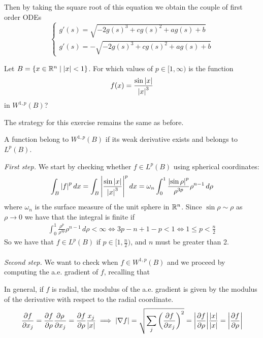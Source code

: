 Then by taking the square root of this equation we obtain the couple of first order ODEs
\[
    \begin{cases}
        g'(s) = \sqrt{-2 g(s)^3 + c g(s)^2 + a g(s) + b} \\
        g'(s) = -\sqrt{-2 g(s)^3 + c g(s)^2 + a g(s) + b}
    \end{cases}
\]

\newpage
\begin{exercise}
        Let \(B = \left\{ x \in \mathbb{R}^n \mid \abs{x} < 1 \right\}\). For which values of \(p \in [1, \infty) \) is the function
        \[
            f(x) = \frac{\sin\abs{x}}{\abs{x}^3}
        \]
        in \(W^{1, p}(B)\)?
\end{exercise}
The strategy for this exercise remains the same as before.
\begin{remark}
    A function belong to \(W^{1, p}(B)\) if its weak derivative exists and belongs to \(L^p(B)\).
\end{remark}
\textit{First step.} We start by checking whether $f \in L^p(B)$ using spherical coordinates:
\[
    \int_B \abs{f}^p \, dx = \int_B \abs{\frac{\sin\abs{x}}{\abs{x}^3}}^p \, dx = \omega_n \int_0^1 \frac{\abs{\sin\rho}^p}{\rho^{3p}} \rho^{n-1} \, d\rho
\]
where \(\omega_n\) is the surface measure of the unit sphere in \(\mathbb{R}^n\).
Since $\sin \rho \sim \rho$ as $\rho \rightarrow 0$ we have that the integral is finite if
\[
    \begin{split}
        \int_0^1 \frac{\rho^p}{\rho^{3p}} \rho^{n-1} \, d\rho < \infty \iff 3p - n + 1 - p < 1 \iff 1 \leq p < \frac{n}{2}
    \end{split}
\]
So we have that $f \in L^p(B)$ if $p \in [1, \frac{n}{2})$, and $n$ must be greater than 2. \\
\vspace{0.1cm}\\
\textit{Second step.} We want to check when \(f \in W^{1, p}(B)\) and we proceed by computing the a.e. gradient of \(f\), recalling that
\begin{remark}
In general, if \(f\) is radial, the modulus of the a.e. gradient is given by the modulus of the derivative with respect to the radial coordinate.
\begin{equation*}
\frac{\partial f}{\partial x_j} = \frac{\partial f}{\partial \rho} \frac{\partial \rho}{\partial x_j} = \frac{\partial f}{\partial \rho} \frac{x_j}{\abs{x}}
\implies \abs{\nabla f} = \sqrt{\sum_j \left(\frac{\partial f}{\partial x_j}\right)^2} = \abs{\frac{\partial f}{\partial \rho}} \frac{\abs{x}}{\abs{x}} = \abs{\frac{\partial f}{\partial \rho}}
\end{equation*}
\end{remark}
